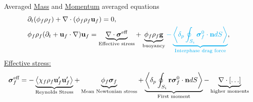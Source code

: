 \documentclass{sintefbeamer}
\begin{document}
\section{}
\begin{frame}{Averaged \underline{Mass} and \underline{Momentum} averaged equations }
  \begin{align*}
    &\partial_t (\phi_f \rho_f)  
    + \mathbf{\nabla}\cdot (
        \phi_f \rho_f\textbf{u}_f
    )
    = 
    0,\\
    &
    \phi_f \rho_f (\partial_t + \textbf{u}_f\cdot \mathbf{\nabla})\textbf{u}_f
    = 
    \underbrace{\mathbf{\nabla}\cdot \bm\sigma^\text{eff}}_\text{Effective stress}
    + \underbrace{\phi_f \rho_f \textbf{g} }_\text{buoyancy}
    \textcolor{cyan}{- \underbrace{\left<\delta_p \oint_{S_{i}} {\bm{\sigma}_f^0 \cdot \textbf{n}} dS\right>}_\text{Interphase drag force}},
  \end{align*}
  \underline{Effective stress: } 
  \begin{equation*}
    \bm{\sigma}_f^\text{eff}
    =
    - \underbrace{\avg{\chi_f\rho_f\textbf{u}_f'\textbf{u}_f'}}_\text{Reynolds Stress}
    + \underbrace{\phi_f \bm{\sigma}_f}_\text{Mean Newtonian stress}%
     + \underbrace{ {\pSavg{{\textbf{r}\bm{\sigma}_f^0 \cdot \textbf{n}}}}}_\text{First moment}
     -\underbrace{\div [\ldots]}_\text{higher moments}
  \end{equation*}
\end{frame}
\end{document}
